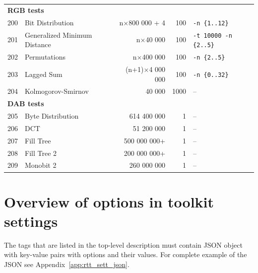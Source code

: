 \documentclass[
  digital,  	%
  color,		%
  oneside,   	%
  12pt,
  nocover,
  notable,
  nolof,
  nolot,
]{fithesis3}
\theoremstyle{definition}
\theoremstyle{remark}
\begin{document}
\begin{nomar}
\begin{tabular}{r | l | r | r | l}
\multicolumn{5}{l}{\textbf{RGB tests}} \\ 
200 & Bit Distribution             & n$\times$800 000 + 4 & 100 & \texttt{-n \{1..12\}} \\
201 & Generalized Minimum Distance & n$\times$40 000 & 100 & \texttt{-t 10000 -n \{2..5\}} \\
202 & Permutations                 & n$\times$400 000 & 100 & \texttt{-n \{2..5\}} \\
203 & Lagged Sum                   & (n+1)$\times$4 000 000 & 100 & \texttt{-n \{0..32\}} \\
204 & Kolmogorov-Smirnov           & 40 000 & 1000 & -- \\ \hline
\multicolumn{5}{l}{\textbf{DAB tests}} \\ 
205 & Byte Distribution & 614 400 000 & 1 & -- \\
206 & DCT               &  51 200 000 & 1 & -- \\
207 & Fill Tree         & 500 000 000+& 1 & -- \\
208 & Fill Tree 2       & 200 000 000+& 1 & -- \\
209 & Monobit 2         & 260 000 000 & 1 & -- \\
\end{tabular}
\end{nomar}

\chapter{Overview of options in toolkit settings}
\label{app:toolkit_settings_detail}

The tags that are listed in the top-level description must contain JSON
object with key-value pairs with options and their values. For complete example of the JSON see Appendix~\ref{app:rtt_sett_json}.
\end{document}
